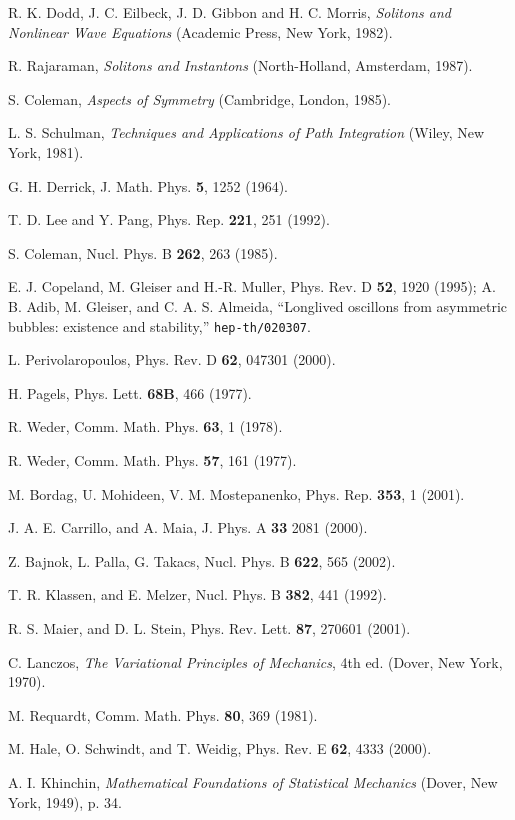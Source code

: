 \documentclass[a4paper,prd,twocolumn,showpacs,amsmath]{revtex4}
\begin{document}

\begin{thebibliography}{99}

 R. K. Dodd, J. C. Eilbeck, J. D. Gibbon and H. C. Morris,
  {\em Solitons and Nonlinear Wave Equations} (Academic Press, New York, 1982).

 R. Rajaraman, {\em
Solitons and Instantons} (North-Holland,  Amsterdam, 1987).

 S. Coleman, {\em Aspects of Symmetry} (Cambridge, London, 1985).

 L. S. Schulman, {\em Techniques and Applications of Path Integration} (Wiley, New York,
1981).

 G. H. Derrick, J. Math. Phys. {\bf 5}, 1252 (1964).

 T. D. Lee and Y. Pang, Phys. Rep. {\bf 221}, 251 (1992).

 S. Coleman, Nucl. Phys. B {\bf 262}, 263 (1985).

 E. J. Copeland, M. Gleiser and H.-R. Muller, Phys. Rev. D
{\bf 52}, 1920 (1995); A. B. Adib, M. Gleiser, and C. A. S. Almeida, ``Longlived
oscillons from asymmetric bubbles: existence and stability,''
{\tt hep-th/020307}.

 L. Perivolaropoulos, Phys. Rev. D {\bf 62}, 047301 (2000).

 H. Pagels, Phys. Lett. {\bf 68B}, 466 (1977).

 R. Weder, Comm. Math. Phys. {\bf 63}, 1 (1978).

 R. Weder, Comm. Math. Phys. {\bf 57}, 161 (1977).

 M. Bordag, U. Mohideen, V. M. Mostepanenko, Phys. Rep. {\bf 353}, 1 (2001).

 J. A. E. Carrillo, and A. Maia, J. Phys. A {\bf 33} 2081 (2000).

 Z. Bajnok, L. Palla, G. Takacs, Nucl. Phys. B {\bf 622}, 565 (2002).

 T. R. Klassen, and E. Melzer, Nucl. Phys. B {\bf 382}, 441 (1992).

 R. S. Maier, and D. L. Stein, Phys. Rev. Lett. {\bf 87}, 270601 (2001).

 C. Lanczos, {\em The Variational Principles of Mechanics},
4th ed. (Dover, New York, 1970).

 M. Requardt, Comm. Math. Phys. {\bf 80}, 369 (1981).

 M. Hale, O. Schwindt, and T. Weidig, Phys. Rev. E {\bf 62}, 4333 (2000).

 A. I. Khinchin, {\em Mathematical Foundations of Statistical Mechanics}
(Dover, New York, 1949), p. 34.

\end{thebibliography}
\end{document}
